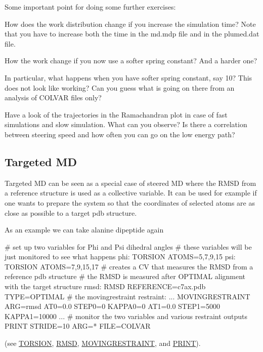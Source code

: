 Some important point for doing some further exercises\+:


\begin{DoxyItemize}
\item How does the work distribution change if you increase the simulation time? Note that you have to increase both the time in the md.\+mdp file and in the plumed.\+dat file.
\item How the work change if you now use a softer spring constant? And a harder one?
\item In particular, what happens when you have softer spring constant, say 10? This does not look like working? Can you guess what is going on there from an analysis of C\+O\+L\+V\+A\+R files only?
\item Have a look of the trajectories in the Ramachandran plot in case of fast simulations and slow simulation. What can you observe? Is there a correlation between steering speed and how often you can go on the low energy path?
\end{DoxyItemize}\hypertarget{belfast-5_belfast-5-target}{}\subsection{Targeted M\+D}\label{belfast-5_belfast-5-target}
Targeted M\+D can be seen as a special case of steered M\+D where the R\+M\+S\+D from a reference structure is used as a collective variable. It can be used for example if one wants to prepare the system so that the coordinates of selected atoms are as close as possible to a target pdb structure.

As an example we can take alanine dipeptide again

\begin{DoxyVerb}# set up two variables for Phi and Psi dihedral angles
# these variables will be just monitored to see what happens
phi: TORSION ATOMS=5,7,9,15
psi: TORSION ATOMS=7,9,15,17
# creates a CV that measures the RMSD from a reference pdb structure
# the RMSD is measured after OPTIMAL alignment with the target structure
rmsd: RMSD REFERENCE=c7ax.pdb TYPE=OPTIMAL
# the movingrestraint
restraint: ...
        MOVINGRESTRAINT
        ARG=rmsd
        AT0=0.0 STEP0=0      KAPPA0=0
        AT1=0.0 STEP1=5000   KAPPA1=10000
...
# monitor the two variables and various restraint outputs
PRINT STRIDE=10 ARG=* FILE=COLVAR
\end{DoxyVerb}
 (see \hyperlink{TORSION}{T\+O\+R\+S\+I\+O\+N}, \hyperlink{RMSD}{R\+M\+S\+D}, \hyperlink{MOVINGRESTRAINT}{M\+O\+V\+I\+N\+G\+R\+E\+S\+T\+R\+A\+I\+N\+T}, and \hyperlink{PRINT}{P\+R\+I\+N\+T}).


